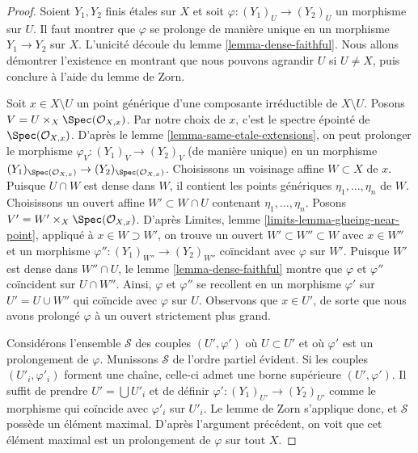 \begin{proof}
Soient $Y_1, Y_2$ finis étales sur $X$ et soit
$\varphi : (Y_1)_U \to (Y_2)_U$ un morphisme sur $U$. Il faut montrer que
$\varphi$ se prolonge de manière unique en un morphisme $Y_1 \to Y_2$ sur $X$.
L'unicité découle du lemme \ref{lemma-dense-faithful}.
Nous allons démontrer l'existence en montrant que nous pouvons agrandir $U$
si $U \not = X$, puis conclure à l'aide du lemme de Zorn.

\medskip\noindent
Soit $x \in X \setminus U$ un point générique d'une composante irréductible
de $X \setminus U$. Posons $V = U \times_X \Spec(\mathcal{O}_{X, x})$.
Par notre choix de $x$, c'est le spectre épointé de
$\Spec(\mathcal{O}_{X, x})$. D'après le
lemme \ref{lemma-same-etale-extensions},
on peut prolonger le morphisme $\varphi_V : (Y_1)_V \to (Y_2)_V$
(de manière unique) en un morphisme
$(Y_1)_{\Spec(\mathcal{O}_{X, x})} \to (Y_2)_{\Spec(\mathcal{O}_{X, x})}$.
Choisissons un voisinage affine $W \subset X$ de $x$.
Puisque $U \cap W$ est dense dans $W$, il contient les points génériques
$\eta_1, \ldots, \eta_n$ de $W$. Choisissons un ouvert affine
$W' \subset W \cap U$ contenant $\eta_1, \ldots, \eta_n$.
Posons $V' = W' \times_X \Spec(\mathcal{O}_{X, x})$.
D'après Limites, lemme \ref{limits-lemma-glueing-near-point},
appliqué à $x \in W \supset W'$,
on trouve un ouvert $W' \subset W'' \subset W$ avec $x \in W''$
et un morphisme $\varphi'' : (Y_1)_{W''} \to (Y_2)_{W''}$
coïncidant avec $\varphi$ sur $W'$. Puisque $W'$ est dense dans
$W'' \cap U$, le lemme \ref{lemma-dense-faithful} montre
que $\varphi$ et $\varphi''$ coïncident sur $U \cap W''$.
Ainsi, $\varphi$ et $\varphi''$ se recollent en un morphisme
$\varphi'$ sur $U' = U \cup W''$ qui coïncide avec $\varphi$ sur $U$.
Observons que $x \in U'$, de sorte que nous avons prolongé $\varphi$
à un ouvert strictement plus grand.

\medskip\noindent
Considérons l'ensemble $\mathcal{S}$ des couples $(U', \varphi')$ où $U \subset U'$
et où $\varphi'$ est un prolongement de $\varphi$. Munissons $\mathcal{S}$
de l'ordre partiel évident. Si les couples $(U'_i, \varphi'_i)$
forment une chaîne, celle-ci admet une borne supérieure $(U', \varphi')$.
Il suffit de prendre $U' = \bigcup U'_i$ et de définir
$\varphi' : (Y_1)_{U'} \to (Y_2)_{U'}$ comme le morphisme
qui coïncide avec $\varphi'_i$ sur $U'_i$. Le lemme de Zorn s'applique donc,
et $\mathcal{S}$ possède un élément maximal. D'après l'argument précédent,
on voit que cet élément maximal est un prolongement de $\varphi$
sur tout $X$.
\end{proof}

